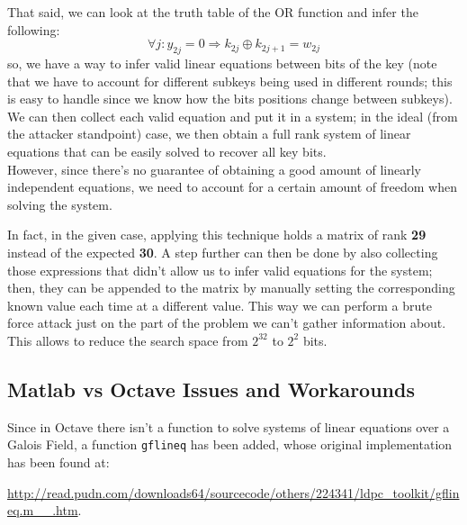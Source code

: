 \documentclass[a4paper,12pt,titlepage]{article}
\begin{document}
That said, we can look at the truth table of the OR function and infer the
following:
\[\forall j : y_{2j} = 0 \Rightarrow k_{2j} \oplus k_{2j+1} = w_{2j}\]
so, we have a way to infer valid linear equations between bits of the key (note
that we have to account for different subkeys being used in different rounds;
this is easy to handle since we know how the bits positions change between
subkeys). \\
We can then collect each valid equation and put it in a system; in the ideal (from
the attacker standpoint) case, we then obtain a full rank system of linear
equations that can be easily solved to recover all key bits. \\
However, since there's no guarantee of obtaining a good amount of linearly
independent equations, we need to account for a certain amount of freedom when
solving the system.

In fact, in the given case, applying this technique holds a matrix of rank
\textbf{29} instead of the expected \textbf{30}. A step further can then be done by also
collecting those expressions that didn't allow us to infer valid equations for
the system; then, they can be appended to the matrix by manually setting the
corresponding known value each time at a different value. This way we can
perform a brute force attack just on the part of the problem we can't gather
information about. This allows to reduce the search space from
$2^{32}$ to $2^2$ bits.

\subsection*{Matlab vs Octave Issues and Workarounds}
Since in Octave there isn't a function to solve systems of linear equations
over a Galois Field, a function \texttt{gflineq} has been added, whose original
implementation has been found at:

\url{http://read.pudn.com/downloads64/sourcecode/others/224341/ldpc_toolkit/gflineq.m__.htm}.
\end{document}
